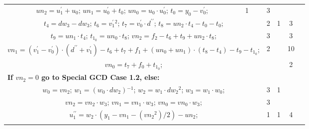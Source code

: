 \begin{tabular}{|c|cr|c|c|c|c|}
{$un_2=u^{\prime}_1+u_0$;\hspace{4pt}
$un_1=u^{\prime}_0+t_0$;\hspace{4pt}
$un_0=u_0 \cdot u^{\prime}_0$;\hspace{4pt}
$t_0=y_0-v^{\prime}_0$;\hspace{4pt}
} & 1 &  & 3 & \\
\multicolumn{3}{|R{340pt}|}{ 
$t_4=dw_3-dw_3$;\hspace{4pt}
$t_6=v^{\prime}_1{}^{2}$;\hspace{4pt}
$t_7=v^{\prime}_0 \cdot d^{\prime\prime}$;\hspace{4pt}
$t_8=un_2 \cdot t_4-t_0-t_0$;\hspace{4pt}
} & 2 & 1 & 3 & \\
\multicolumn{3}{|R{340pt}|}{ 
$t_9=un_1 \cdot t_4$;\hspace{4pt}
$t_1_0=un_0 \cdot t_8$;\hspace{4pt}
$vn_2=f_2-t_6+t_9+un_2 \cdot t_8$;\hspace{4pt}
} & 3 &  & 3 & \\
\multicolumn{3}{|R{340pt}|}{ 
$vn_1=(v^{\prime}_1-v^{\prime}_0) \cdot (d^{\prime\prime}+v^{\prime}_1)-t_6+t_7+f_1+(un_0+un_1) \cdot (t_8-t_4)-t_9-t_1_0$;\hspace{4pt}
} & 2 &  & 10 & \\
\multicolumn{3}{|R{340pt}|}{ 
$vn_0=t_7+f_0+t_1_0$;\hspace{4pt}
} &  &  & 2 & \\
\multicolumn{3}{|l|}{ 
 \bf{If $vn_2 = 0$ go to Special GCD Case 1.2, else:} } &  &  &  & \\
\multicolumn{3}{|R{340pt}|}{ 
$w_0=vn_2$;\hspace{4pt}
$w_1=(w_0 \cdot dw_2){}^{-1}$;\hspace{4pt}
$w_2=w_1 \cdot dw_2{}^{2}$;\hspace{4pt}
$w_3=w_1 \cdot w_0$;\hspace{4pt}
} & 3 & 1 &  & \\
\multicolumn{3}{|R{340pt}|}{ 
$vn_2=vn_2 \cdot w_3$;\hspace{4pt}
$vn_1=vn_1 \cdot w_3$;\hspace{4pt}
$vn_0=vn_0 \cdot w_3$;\hspace{4pt}
} & 3 &  &  & \\
\multicolumn{3}{|R{340pt}|}{ 
$u^{\prime\prime}_1=w_2 \cdot (y_1-vn_1-(vn_2{}^{2})/2)-un_2$;\hspace{4pt}
} & 1 & 1 & 4 & \\
\multicolumn{3}{|R{340pt}|}{ 
}
\end{tabular}
